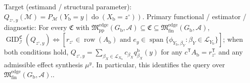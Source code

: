 \documentclass{article}
\begin{document}
Target (estimand / structural parameter): \(Q_{z^{\circ},y}(\mathcal M)=P_{\mathcal M}(Y_{\mathrm b}=y\mid\operatorname{do}(X_{\mathrm b}=z^{\circ}))\).
Primary functional / estimator / diagnostic: For every \(\mathfrak C\) with \(\mathfrak M_{\mathrm{pp}}^{\mathrm{edge}}(G_{\mathrm b},\mathcal A)\subseteq\mathfrak C\subseteq\mathfrak M_{\mathrm{fin}}^{\mathrm{edge}}(G_{\mathrm b},\mathcal A)\), \(\operatorname{GID}_{\mathcal I}^{\mathfrak C}(Q_{z^{\circ},y})\Longleftrightarrow[r_{z^{\circ}}\in\operatorname{row}(A_{\mathrm b})\text{ and }e_y\in\operatorname{span}\{\phi_{Y_{\mathrm b},\beta_Y}:\beta_Y\in\mathcal L_{Y_{\mathrm b}}\}]\); when both conditions hold, \(Q_{z^{\circ},y}=\sum_{\beta_X\in\mathcal L_{X_{\mathrm b}}}c_{\beta_X}q^{\mathrm b}_{\beta_X}(y)\) for any \(c^{\mathsf T}A_{\mathrm b}=r_{z^{\circ}}^{\mathsf T}\) and any admissible effect synthesis \(\mu^y\).  In particular, this identifies the query over \(\mathfrak M_{\mathrm{fin}}^{\mathrm{edge}}(G_{\mathrm b},\mathcal A)\)..
\end{document}
